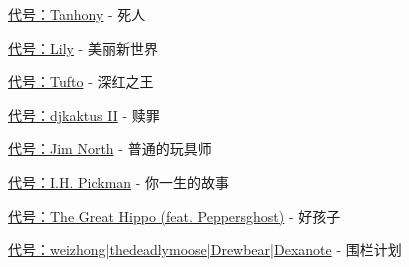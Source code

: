 \begin{scpboxbrc}
\hyperref[chap:SCP-001.dead.men]{代号：Tanhony} - 死人

\hyperref[chap:SCP-001.the.world.gone.beautiful]{代号：Lily} - 美丽新世界

\hyperref[chap:SCP-001.the.scarlet.king]{代号：Tufto} - 深红之王

\hyperref[chap:SCP-001.atonement]{代号：djkaktus II} - 赎罪

\hyperref[chap:SCP-001.a.simple.toymaker]{代号：Jim North} - 普通的玩具师

\hyperref[chap:SCP-001.story.of.your.life]{代号：I.H. Pickman} - 你一生的故事

\hyperref[chap:SCP-001.a.good.boy]{代号：The Great Hippo (feat. Peppersghost)} - 好孩子

\hyperref[chap:SCP-001.project.palisade]{代号：weizhong|thedeadlymoose|Drewbear|Dexanote} - 围栏计划

\end{scpboxbrc}

